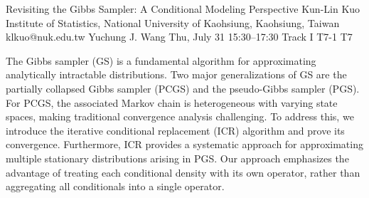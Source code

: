 \begin{talk}
  {Revisiting the Gibbs Sampler: A Conditional Modeling Perspective}%
  {Kun-Lin Kuo}%
  {Institute of Statistics, National University of Kaohsiung, Kaohsiung, Taiwan}%
  {klkuo@nuk.edu.tw}%
  {Yuchung J. Wang}%
  {}%
  {Thu, July 31 15:30–17:30 Track I}%
  {T7-1}%
  {T7}%
  {}%
				
			
The Gibbs sampler (GS) is a fundamental algorithm for approximating analytically intractable distributions.
Two major generalizations of GS are the partially collapsed Gibbs sampler (PCGS) and the pseudo-Gibbs sampler (PGS). For PCGS, the associated Markov chain is heterogeneous with varying state spaces, making traditional convergence analysis challenging. To address this, we introduce the iterative conditional replacement (ICR) algorithm and prove its convergence. Furthermore, ICR provides a systematic approach for approximating multiple stationary distributions arising in PGS.
Our approach emphasizes the advantage of treating each conditional density with its own operator, rather than aggregating all conditionals into a single operator.

\medskip

\end{talk}

